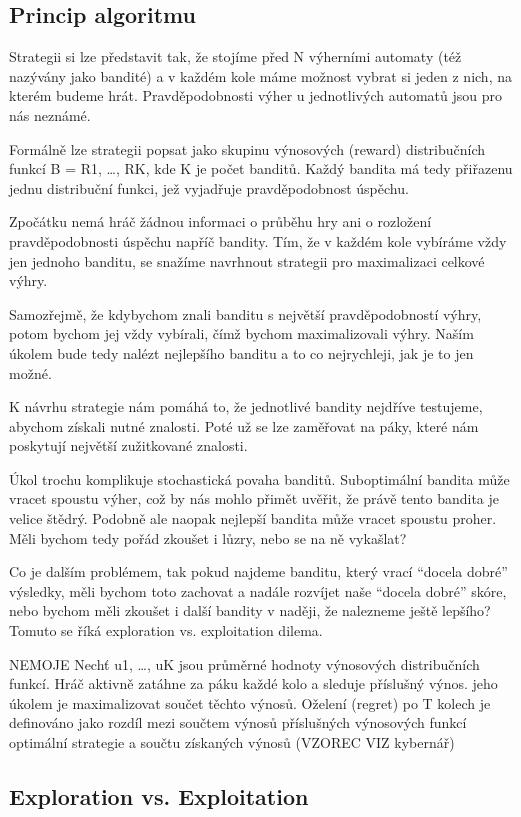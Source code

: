 \documentclass[thesis=M,czech]{FITthesis}[2014/05/07]
\begin{document}
\subsection{Princip algoritmu}
Strategii si lze představit tak, že stojíme před N výherními automaty (též nazývány jako bandité) a v každém kole máme možnost vybrat si jeden z nich, na kterém budeme hrát. Pravděpodobnosti výher u jednotlivých automatů jsou pro nás neznámé. 

Formálně lze strategii popsat jako skupinu výnosových (reward) distribučních funkcí B = {R1, …, RK}, kde K je počet banditů. Každý bandita má tedy přiřazenu jednu distribuční funkci, jež vyjadřuje pravděpodobnost úspěchu. 

Zpočátku nemá hráč žádnou informaci o průběhu hry ani o rozložení pravděpodobnosti úspěchu napříč bandity. Tím, že v každém kole vybíráme vždy jen jednoho banditu, se snažíme navrhnout strategii pro maximalizaci celkové výhry.

Samozřejmě, že kdybychom znali banditu s největší pravděpodobností výhry, potom bychom jej vždy vybírali, čímž bychom maximalizovali výhry. Naším úkolem bude tedy nalézt nejlepšího banditu a to co nejrychleji, jak je to jen možné.

K návrhu strategie nám pomáhá to, že jednotlivé bandity nejdříve testujeme, abychom získali nutné znalosti. Poté už se lze zaměřovat na páky, které nám poskytují největší zužitkované znalosti. 

Úkol trochu komplikuje stochastická povaha banditů. Suboptimální bandita může vracet spoustu výher, což by nás mohlo přimět uvěřit, že právě tento bandita je velice štědrý. Podobně ale naopak nejlepší bandita může vracet spoustu proher. Měli bychom tedy pořád zkoušet i lůzry, nebo se na ně vykašlat?

Co je dalším problémem, tak pokud najdeme banditu, který vrací “docela dobré” výsledky, měli bychom toto zachovat a nadále rozvíjet naše “docela dobré” skóre, nebo bychom měli zkoušet i další bandity v naději, že nalezneme ještě lepšího? Tomuto se říká exploration vs. exploitation dilema.

NEMOJE
Nechť u1, …, uK jsou průměrné hodnoty výnosových distribučních funkcí. Hráč aktivně zatáhne za páku každé kolo a sleduje příslušný výnos. jeho úkolem je maximalizovat součet těchto výnosů. Oželení (regret) po T kolech je definováno jako rozdíl mezi součtem výnosů příslušných výnosových funkcí optimální strategie a součtu získaných výnosů (VZOREC VIZ kybernář)

\subsection{Exploration vs. Exploitation}
\end{document}
